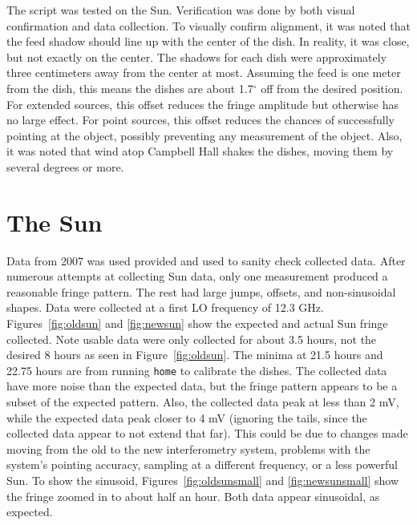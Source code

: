 \documentclass[12pt]{article}
\newcommand{\degree}{\ensuremath{^\circ} }
\begin{document}
The script was tested on the Sun.
Verification was done by both visual confirmation and data collection.
To visually confirm alignment, it was noted that the feed shadow should line up with the center of the dish.
In reality, it was close, but not exactly on the center.
The shadows for each dish were approximately three centimeters away from the center at most.
Assuming the feed is one meter from the dish, this means the dishes are about 1.7\degree off from the desired position.
For extended sources, this offset reduces the fringe amplitude but otherwise has no large effect.
For point sources, this offset reduces the chances of successfully pointing at the object, possibly preventing any measurement of the object.
Also, it was noted that wind atop Campbell Hall shakes the dishes, moving them by several degrees or more.

\section{The Sun}

Data from 2007 was used provided and used to sanity check collected data.
After numerous attempts at collecting Sun data, only one measurement produced a reasonable fringe pattern.
The rest had large jumps, offsets, and non-sinusoidal shapes.
Data were collected at a first LO frequency of 12.3 GHz.
Figures~\ref{fig:oldsun} and \ref{fig:newsun} show the expected and actual Sun fringe collected.
Note usable data were only collected for about 3.5 hours, not the desired 8 hours as seen in Figure~\ref{fig:oldsun}.
The minima at 21.5 hours and 22.75 hours are from running \texttt{home} to calibrate the dishes.
The collected data have more noise than the expected data, but the fringe pattern appears to be a subset of the expected pattern.
Also, the collected data peak at less than 2 mV, while the expected data peak closer to 4 mV (ignoring the tails, since the collected data appear to not extend that far).
This could be due to changes made moving from the old to the new interferometry system, problems with the system's pointing accuracy, sampling at a different frequency, or a less powerful Sun.
To show the sinusoid, Figures~\ref{fig:oldsunsmall} and \ref{fig:newsunsmall} show the fringe zoomed in to about half an hour.
Both data appear sinusoidal, as expected.
\end{document}
